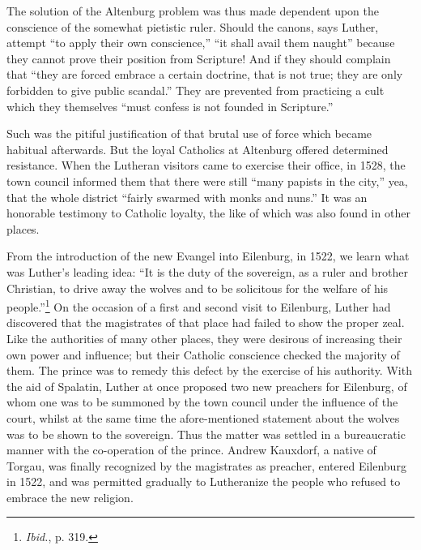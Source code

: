 The solution of the Altenburg problem was thus made dependent
upon the conscience of the somewhat pietistic ruler. Should the canons,
says Luther, attempt “to apply their own conscience,” “it shall
avail them naught” because they cannot prove their position from
Scripture! And if they should complain that “they are forced embrace
a certain doctrine, that is not true; they are only forbidden to
give public scandal.” They are prevented from practicing a cult which
they themselves “must confess is not founded in Scripture.”

Such was the pitiful justification of that brutal use of force which
became habitual afterwards. But the loyal Catholics at Altenburg
offered determined resistance. When the Lutheran visitors
came to exercise their office, in 1528, the town council informed
them that there were still “many papists in the city,” yea, that the
whole district “fairly swarmed with monks and nuns.” It was an
honorable testimony to Catholic loyalty, the like of which was also
found in other places.

From the introduction of the new Evangel into Eilenburg, in 1522,
we learn what was Luther’s leading idea: “It is the duty of the sovereign,
as a ruler and brother Christian, to drive away the wolves and to
be solicitous for the welfare of his people.”\footnote{\textit{Ibid.}, p. 319.}
On the occasion of
a first and second visit to Eilenburg, Luther had discovered that the
magistrates of that place had failed to show the proper zeal. Like the
authorities of many other places, they were desirous of increasing
their own power and influence; but their Catholic conscience checked
the majority of them. The prince was to remedy this defect by the
exercise of his authority. With the aid of Spalatin, Luther at once
proposed two new preachers for Eilenburg, of whom one was to be
summoned by the town council under the influence of the court,
whilst at the same time the afore-mentioned statement about the
wolves was to be shown to the sovereign. Thus the matter was settled
in a bureaucratic manner with the co-operation of the prince. Andrew
Kauxdorf, a native of Torgau, was finally recognized by the
magistrates as preacher, entered Eilenburg in 1522, and was permitted gradually
to Lutheranize the people who refused to embrace the new religion.

